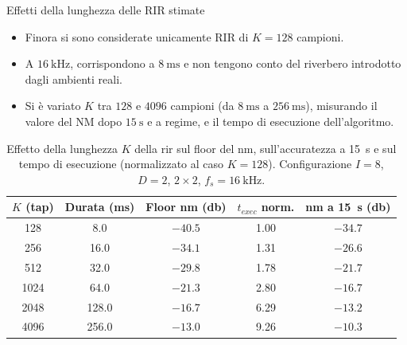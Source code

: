 \documentclass[aspectratio=169,xcolor=dvipsnames]{beamer}
\begin{document}
\begin{frame}{Effetti della lunghezza delle RIR stimate}
    \begin{itemize}
        \item Finora si sono considerate unicamente RIR di $K=128$ campioni.
        \item A $16\ \si{\kilo\hertz}$, corrispondono a $8\ \si{\milli\second}$ e non tengono conto del riverbero introdotto dagli ambienti reali.
        \item Si è variato $K$ tra $128$ e $4096$ campioni (da $8\ \si{\milli\second}$ a $256\ \si{\milli\second}$), misurando il valore del NM dopo $15\ \si{\second}$ e a regime, e il tempo di esecuzione dell'algoritmo.
    \end{itemize}

    \begin{table}[H]
		\centering
		\begin{tabular}{|c|c|c|c|c|}
			\hline
			$K$ (tap) & Durata (\si{\milli\second}) & Floor \ac{nm} (\si{\decibel}) & $t_{exec}$ norm. & \ac{nm} a \SI{15}{\second} (\si{\decibel}) \\
			\hline
			128  & 8.0   & $-40.5$ & 1.00 & $-34.7$ \\
			256  & 16.0  & $-34.1$ & 1.31 & $-26.6$ \\
			512  & 32.0  & $-29.8$ & 1.78 & $-21.7$ \\
			1024 & 64.0  & $-21.3$ & 2.80 & $-16.7$ \\
			2048 & 128.0 & $-16.7$ & 6.29 & $-13.2$ \\
			4096 & 256.0 & $-13.0$ & 9.26 & $-10.3$ \\
			\hline
		\end{tabular}
		\caption{Effetto della lunghezza $K$ della \ac{rir} sul floor del \ac{nm}, sull'accuratezza a \SI{15}{\second} e sul tempo di esecuzione (normalizzato al caso $K = 128$). Configurazione $I = 8$, $D = 2$, $2 \times 2$, $f_s = \SI{16}{\kilo\hertz}$.}
		\label{tab:rir_length}
	\end{table}
\end{frame}
\end{document}
